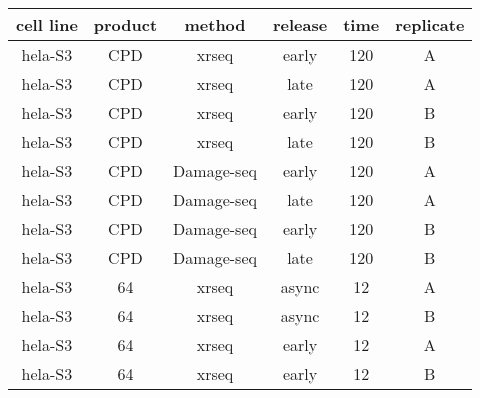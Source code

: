 \begin{table}[H]
    \centering
    \begin{adjustbox}{max width=\textwidth}
    \begin{tabular}{cccccc}
    \hline
    \multicolumn{1}{|c|}{\textbf{cell line}} & \multicolumn{1}{c|}{\textbf{product}} & \multicolumn{1}{c|}{\textbf{method}} & \multicolumn{1}{c|}{\textbf{release}} & \multicolumn{1}{c|}{\textbf{time}} & \multicolumn{1}{c|}{\textbf{replicate}} \\ \hline
    \gls{hela}-S3           & \gls{CPD}              & \gls{xrseq}         & early            & 120           & A                  \\ \hline 
    \gls{hela}-S3           & \gls{CPD}              & \gls{xrseq}         & late             & 120           & A                  \\ \hline 
    \gls{hela}-S3           & \gls{CPD}              & \gls{xrseq}         & early            & 120           & B                  \\ \hline 
    \gls{hela}-S3           & \gls{CPD}              & \gls{xrseq}         & late             & 120           & B                  \\ \hline 
    \gls{hela}-S3           & \gls{CPD}              & Damage-seq     & early            & 120           & A                  \\ \hline 
    \gls{hela}-S3           & \gls{CPD}              & Damage-seq     & late             & 120           & A                  \\ \hline 
    \gls{hela}-S3           & \gls{CPD}              & Damage-seq     & early            & 120           & B                  \\ \hline 
    \gls{hela}-S3           & \gls{CPD}              & Damage-seq     & late             & 120           & B                  \\ \hline 
    \gls{hela}-S3           & \gls{64}           & \gls{xrseq}         & async            & 12            & A                  \\ \hline 
    \gls{hela}-S3           & \gls{64}           & \gls{xrseq}         & async            & 12            & B                  \\ \hline 
    \gls{hela}-S3           & \gls{64}           & \gls{xrseq}         & early            & 12            & A                  \\ \hline 
    \gls{hela}-S3           & \gls{64}           & \gls{xrseq}         & early            & 12            & B                  \\ \hline 

\end{tabular}
\end{adjustbox}
\end{table}
